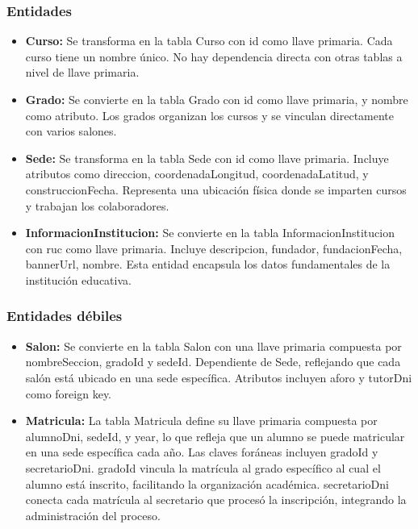 \subsubsection{Entidades}
\begin{itemize}
	\item \textbf{Curso:} Se transforma en la tabla Curso con id como llave primaria. Cada curso tiene un nombre único. No hay dependencia directa con otras tablas a nivel de llave primaria.
	\item \textbf{Grado:} Se convierte en la tabla Grado con id como llave primaria, y nombre como atributo. Los grados organizan los cursos y se vinculan directamente con varios salones.
	\item \textbf{Sede:} Se transforma en la tabla Sede con id como llave primaria. Incluye atributos como direccion, coordenadaLongitud, coordenadaLatitud, y construccionFecha. Representa una ubicación física donde se imparten cursos y trabajan los colaboradores.
	\item \textbf{InformacionInstitucion:} Se convierte en la tabla InformacionInstitucion con ruc como llave primaria. Incluye descripcion, fundador, fundacionFecha, bannerUrl, nombre. Esta entidad encapsula los datos fundamentales de la institución educativa.
\end{itemize}
\subsubsection{Entidades débiles}
\begin{itemize}
	\item \textbf{Salon:} Se convierte en la tabla Salon con una llave primaria compuesta por nombreSeccion, gradoId y sedeId. Dependiente de Sede, reflejando que cada salón está ubicado en una sede específica. Atributos incluyen aforo y tutorDni como foreign key.
	\item \textbf{Matricula:} La tabla Matricula define su llave primaria compuesta por alumnoDni, sedeId, y year, lo que refleja que un alumno se puede matricular en una sede específica cada año. Las claves foráneas incluyen gradoId y secretarioDni. gradoId vincula la matrícula al grado específico al cual el alumno está inscrito, facilitando la organización académica. secretarioDni conecta cada matrícula al secretario que procesó la inscripción, integrando la administración del proceso.
\end{itemize}

